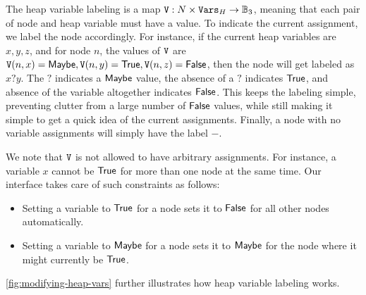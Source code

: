 The heap variable labeling is a map $\mathtt{V}: N \times \mathtt{Vars}_H \to \mathbb{B}_3$,
meaning that each pair of node and heap variable must have a value. To indicate the
current assignment, we label the node accordingly. For instance, if the current heap
variables are $x, y, z$, and for node $n$, the values of $\mathtt{V}$ are
$\mathtt{V}(n, x) = \mathsf{Maybe}, \mathtt{V}(n, y) = \mathsf{True}, \mathtt{V}(n, z) = \mathsf{False}$, then the
node will get labeled as $x?y$. The $?$ indicates a $\mathsf{Maybe}$ value, the absence of a $?$
indicates $\mathsf{True}$, and absence of the variable altogether indicates $\mathsf{False}$. This keeps
the labeling simple, preventing clutter from a large number of $\mathsf{False}$ values, while
still making it simple to get a quick idea of the current assignments. Finally, a node
with no variable assignments will simply have the label $-$.

We note that $\mathtt{V}$ is not allowed to have arbitrary assignments. For instance, a
variable $x$ cannot be $\mathsf{True}$ for more than one node at the same time. Our interface
takes care of such constraints as follows:

\begin{itemize}
  \item Setting a variable to $\mathsf{True}$ for a node sets it to $\mathsf{False}$ for all other nodes automatically.
  \item Setting a variable to $\mathsf{Maybe}$ for a node sets it to $\mathsf{Maybe}$ for the node where it might currently be $\mathsf{True}$.
\end{itemize}

\autoref{fig:modifying-heap-vars} further illustrates how heap variable labeling works.

